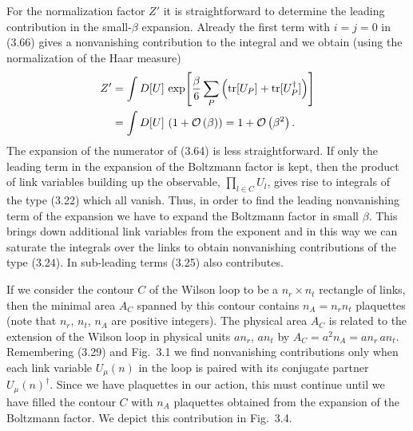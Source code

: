 For the normalization factor $Z'$ it is straightforward to determine the
leading contribution in the small-$\beta$ expansion. Already the first term with
$i = j = 0$ in (3.66) gives a nonvanishing contribution to the integral and we
obtain (using the normalization of the Haar measure)
\begin{equation}
  \begin{split}
    Z' &= \int D[U]\,\exp\!\left[\frac{\beta}{6}\sum_P
      \left(\operatorname{tr}[U_P] + \operatorname{tr}[U_P^\dagger]\right)\right]\\
    &= \int D[U]\,\left(1 + \mathcal{O}\left(\beta\right)\right)
    = 1 + \mathcal{O}\left(\beta^2\right) .
  \end{split}
\end{equation}
The expansion of the numerator of (3.64) is less straightforward. If only the
leading term in the expansion of the Boltzmann factor is kept, then the product
of link variables building up the observable, $\prod_{l\in C} U_l$, gives rise
to integrals of the type (3.22) which all vanish. Thus, in order to find the
leading nonvanishing term of the expansion we have to expand the Boltzmann
factor in small $\beta$. This brings down additional link variables from the
exponent and in this way we can saturate the integrals over the links to obtain
nonvanishing contributions of the type (3.24). In sub-leading terms (3.25) also
contributes.

If we consider the contour $C$ of the Wilson loop to be a $n_r \times n_t$
rectangle of links, then the minimal area $A_C$ spanned by this contour
contains $n_A = n_r n_t$ plaquettes (note that $n_r$, $n_t$, $n_A$ are positive
integers). The physical area $A_C$ is related to the extension of the Wilson
loop in physical units $a n_r$, $a n_t$ by $A_C = a^2 n_A = a n_r\, a n_t$.
Remembering (3.29) and Fig.~3.1 we find nonvanishing contributions only when
each link variable $U_\mu(n)$ in the loop is paired with its conjugate partner
$U_\mu(n)^\dagger$. Since we have plaquettes in our action, this must continue
until we have filled the contour $C$ with $n_A$ plaquettes obtained from the
expansion of the Boltzmann factor. We depict this contribution in Fig.~3.4.

